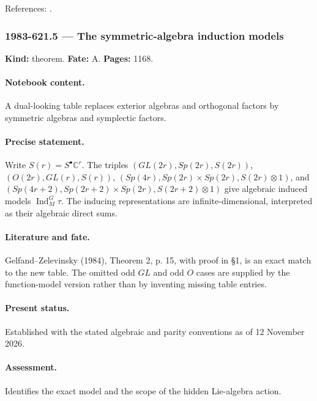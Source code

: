 \noindent References: \citep{gelfandzelevinsky1984models}.\par

\subsubsection{1983-621.5 --- The symmetric-algebra induction models}

\label{item:1983-621.5}

\noindent\textbf{Kind:} theorem. \textbf{Fate:} A. \textbf{Pages:} 1168.\par

\paragraph{Notebook content.} A dual-looking table replaces exterior algebras and orthogonal factors by symmetric algebras and symplectic factors.

\paragraph{Precise statement.} Write \(S(r)=S^\bullet\mathbb C^r\). The triples \((GL(2r),Sp(2r),S(2r))\), \((O(2r),GL(r),S(r))\), \((Sp(4r),Sp(2r)\times Sp(2r),S(2r)\otimes1)\), and \((Sp(4r+2),Sp(2r+2)\times Sp(2r),S(2r+2)\otimes1)\) give algebraic induced models \(\operatorname{Ind}_M^G\tau\). The inducing representations are infinite-dimensional, interpreted as their algebraic direct sums.

\paragraph{Literature and fate.} Gelfand–Zelevinsky (1984), Theorem 2, p. 15, with proof in \S1, is an exact match to the new table. The omitted odd \(GL\) and odd \(O\) cases are supplied by the function-model version rather than by inventing missing table entries.

\paragraph{Present status.} Established with the stated algebraic and parity conventions as of 12 November 2026.

\paragraph{Assessment.} Identifies the exact model and the scope of the hidden Lie-algebra action.


